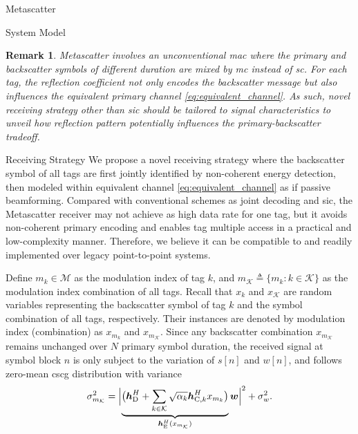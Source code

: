 \documentclass[journal]{IEEEtran}
\newtheorem{remark}{Remark}
\begin{document}
\begin{section}{Metascatter}
\begin{subsection}{System Model}
		\begin{remark}
			Metascatter involves an unconventional \gls{mac} where the primary and backscatter symbols of different duration are mixed by \gls{mc} instead of \gls{sc}.
			For each tag, the reflection coefficient not only encodes the backscatter message but also influences the equivalent primary channel \eqref{eq:equivalent_channel}.
			As such, novel receiving strategy other than \gls{sic} should be tailored to signal characteristics to unveil how reflection pattern potentially influences the primary-backscatter tradeoff.
		\end{remark}
	\end{subsection}

	\begin{subsection}{Receiving Strategy}
		We propose a novel receiving strategy where the backscatter symbol of all tags are first jointly identified by non-coherent energy detection, then modeled within equivalent channel \eqref{eq:equivalent_channel} as if passive beamforming.
		Compared with conventional schemes as joint decoding and \gls{sic}, the Metascatter receiver may not achieve as high data rate for one tag, but it avoids non-coherent primary encoding and enables tag multiple access in a practical and low-complexity manner.
		Therefore, we believe it can be compatible to and readily implemented over legacy point-to-point systems.

		Define $m_k \in \mathcal{M}$ as the modulation index of tag $k$, and $m_{\mathcal{K}} \triangleq \{m_k: k \in \mathcal{K}\}$ as the modulation index combination of all tags.
		Recall that $x_k$ and $x_{\mathcal{K}}$ are random variables representing the backscatter symbol of tag $k$ and the symbol combination of all tags, respectively.
		Their instances are denoted by modulation index (combination) as $x_{m_k}$ and $x_{m_\mathcal{K}}$.
		Since any backscatter combination $x_{m_\mathcal{K}}$ remains unchanged over $N$ primary symbol duration, the received signal at symbol block $n$ is only subject to the variation of $s[n]$ and $w[n]$, and follows zero-mean \gls{cscg} distribution with variance
		\begin{equation}
			\sigma_{m_{\mathcal{K}}}^2 = \Bigl\lvert \underbrace{\bigl(\boldsymbol{h}_{\mathrm{D}}^H + \sum_{k \in \mathcal{K}} \sqrt{\alpha_k} \boldsymbol{h}_{\mathrm{C},k}^H x_{m_k}\bigr)}_{\boldsymbol{h}_{\mathrm{E}}^H(x_{m_{\mathcal{K}}})} \boldsymbol{w} \Bigr\rvert^2 + \sigma_w^2.
			\label{eq:receive_variance}
		\end{equation}


\end{subsection}
\end{section}
\end{document}
